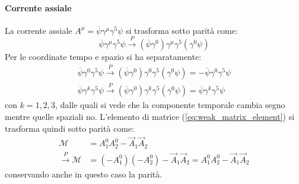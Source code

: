 \documentclass{subnucbo}
\begin{document}
\paragraph{Corrente assiale} La corrente assiale $A ^ { \mu } = \overline { \psi } \gamma ^ { \mu } \gamma ^ { 5 } \psi$ si trasforma sotto parità come:
\begin{equation}
        \overline { \psi } \gamma ^ { \mu } \gamma ^ { 5 } \psi \stackrel { P } { \rightarrow } \left( \overline { \psi } \gamma ^ { 0 } \right) \gamma ^ { \mu } \gamma ^ { 5 } \left( \gamma ^ { 0 } \psi \right)
\end{equation}
Per le coordinate tempo e spazio si ha separatamente:
\begin{equation}
        \begin{array} { l } { \overline { \psi } \gamma ^ { 0 } \gamma ^ { 5 } \psi \stackrel { P } { \rightarrow } \left( \overline { \psi } \gamma ^ { 0 } \right) \gamma ^ { 0 } \gamma ^ { 5 } \left( \gamma ^ { 0 } \psi \right) = - \overline { \psi } \gamma ^ { 0 } \gamma ^ { 5 } \psi } \\ { \overline { \psi } \gamma ^ { k } \gamma ^ { 5 } \psi \stackrel { P } { \rightarrow } \left( \overline { \psi } \gamma ^ { 0 } \right) \gamma ^ { k } \gamma ^ { 5 } \left( \gamma ^ { 0 } \psi \right) = \overline { \psi } \gamma ^ { k } \gamma ^ { 5 } \psi } \end{array}
\end{equation}
con $k=1,2,3$, dalle quali si vede che la componente temporale cambia segno mentre quelle spaziali no. L'elemento di matrice (\ref{eq:weak_matrix_element}) si trasforma quindi sotto parità come:
\begin{equation}
        \begin{aligned}
                \mathcal{M} & = A _ { 1 } ^ { 0 } A _ { 2 } ^ { 0 } - \vec { A } _ { 1 } \vec { A } _ { 2 } \\ \stackrel { P } { \rightarrow } \mathcal{M} & = \left( - A _ { 1 } ^ { 0 } \right) \left( - A _ { 2 } ^ { 0 } \right) - \vec { A } _ { 1 } \vec { A } _ { 2 } = A _ { 1 } ^ { 0 } A _ { 2 } ^ { 0 } - \vec { A } _ { 1 } \vec { A } _ { 2 }
        \end{aligned}
\end{equation}
conservando anche in questo caso la parità.
\end{document}
